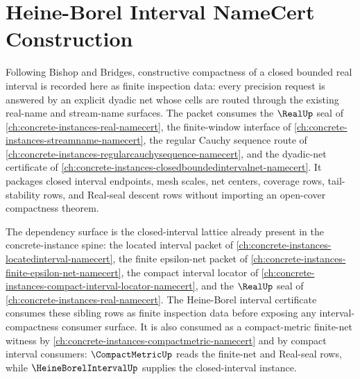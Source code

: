 \chapter{Heine-Borel Interval NameCert Construction}
\label{ch:concrete-instances-heineborelinterval-namecert}

Following Bishop and Bridges, constructive compactness of a closed bounded real interval is recorded here as finite inspection data: every precision request is answered by an explicit dyadic net whose cells are routed through the existing real-name and stream-name surfaces. The packet consumes the $\RealUp$ seal of \autoref{ch:concrete-instances-real-namecert}, the finite-window interface of \autoref{ch:concrete-instances-streamname-namecert}, the regular Cauchy sequence route of \autoref{ch:concrete-instances-regularcauchysequence-namecert}, and the dyadic-net certificate of \autoref{ch:concrete-instances-closedboundedintervalnet-namecert}. It packages closed interval endpoints, mesh scales, net centers, coverage rows, tail-stability rows, and Real-seal descent rows without importing an open-cover compactness theorem.

The dependency surface is the closed-interval lattice already present in the concrete-instance spine: the located interval packet of \autoref{ch:concrete-instances-locatedinterval-namecert}, the finite epsilon-net packet of \autoref{ch:concrete-instances-finite-epsilon-net-namecert}, the compact interval locator of \autoref{ch:concrete-instances-compact-interval-locator-namecert}, and the $\RealUp$ seal of \autoref{ch:concrete-instances-real-namecert}. The Heine-Borel interval certificate consumes these sibling rows as finite inspection data before exposing any interval-compactness consumer surface. It is also consumed as a compact-metric finite-net witness by \autoref{ch:concrete-instances-compactmetric-namecert} and by compact interval consumers: $\CompactMetricUp$ reads the finite-net and Real-seal rows, while $\HeineBorelIntervalUp$ supplies the closed-interval instance.

